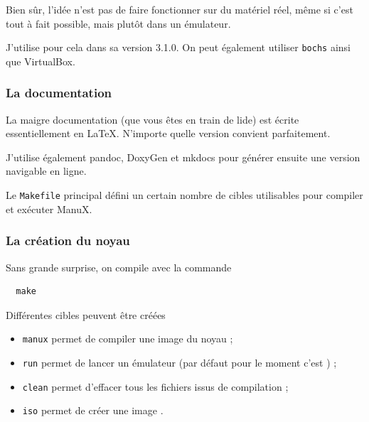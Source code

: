    Bien sûr, l'idée n'est pas de faire fonctionner \manux sur du
matériel réel, même si c'est tout à fait possible, mais plutôt dans un
émulateur.

   J'utilise pour cela \qemu dans sa version 3.1.0. On peut
également utiliser {\tt bochs} ainsi que VirtualBox.
   
%
\subsubsection{La documentation}

   La maigre documentation (que vous êtes  en train de lide) est
écrite essentiellement en LaTeX. N'importe quelle version convient
parfaitement.

   J'utilise également pandoc, DoxyGen et mkdocs pour générer ensuite une
version navigable en ligne.

%

   Le {\tt Makefile} principal défini un certain nombre de cibles
utilisables pour compiler et exécuter ManuX.
   
%
\subsubsection{La création du noyau}

   Sans grande surprise, on compile avec la commande

\begin{lstlisting}
  make
\end{lstlisting}

  Différentes cibles peuvent être créées

\begin{itemize}
   \item {\tt manux} permet de compiler une image du noyau ;
   \item {\tt run} permet de lancer un émulateur (par défaut pour le moment c'est \qemu) ;
   \item {\tt clean} permet d'effacer tous les fichiers issus de compilation ;
   \item {\tt iso} permet de créer une image \iso.
\end{itemize}

